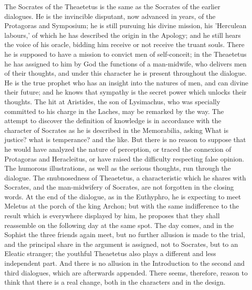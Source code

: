 \documentclass[11pt,letter]{article}
\begin{document}
\par  The Socrates of the Theaetetus is the same as the Socrates of the earlier dialogues. He is the invincible disputant, now advanced in years, of the Protagoras and Symposium; he is still pursuing his divine mission, his 'Herculean labours,' of which he has described the origin in the Apology; and he still hears the voice of his oracle, bidding him receive or not receive the truant souls. There he is supposed to have a mission to convict men of self-conceit; in the Theaetetus he has assigned to him by God the functions of a man-midwife, who delivers men of their thoughts, and under this character he is present throughout the dialogue. He is the true prophet who has an insight into the natures of men, and can divine their future; and he knows that sympathy is the secret power which unlocks their thoughts. The hit at Aristides, the son of Lysimachus, who was specially committed to his charge in the Laches, may be remarked by the way. The attempt to discover the definition of knowledge is in accordance with the character of Socrates as he is described in the Memorabilia, asking What is justice? what is temperance? and the like. But there is no reason to suppose that he would have analyzed the nature of perception, or traced the connexion of Protagoras and Heracleitus, or have raised the difficulty respecting false opinion. The humorous illustrations, as well as the serious thoughts, run through the dialogue. The snubnosedness of Theaetetus, a characteristic which he shares with Socrates, and the man-midwifery of Socrates, are not forgotten in the closing words. At the end of the dialogue, as in the Euthyphro, he is expecting to meet Meletus at the porch of the king Archon; but with the same indifference to the result which is everywhere displayed by him, he proposes that they shall reassemble on the following day at the same spot. The day comes, and in the Sophist the three friends again meet, but no further allusion is made to the trial, and the principal share in the argument is assigned, not to Socrates, but to an Eleatic stranger; the youthful Theaetetus also plays a different and less independent part. And there is no allusion in the Introduction to the second and third dialogues, which are afterwards appended. There seems, therefore, reason to think that there is a real change, both in the characters and in the design.
\end{document}
